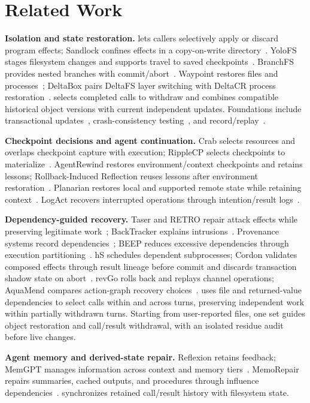 \section{Related Work}

\textbf{Isolation and state restoration.}
\trycmd lets callers selectively apply or discard program effects; Sandlock
confines effects in a copy-on-write directory~\cite{try-osdi26,sandlock}.
YoloFS stages filesystem changes and supports travel to saved
checkpoints~\cite{yolofs}.
BranchFS provides nested branches with commit/abort~\cite{branchfs}.
Waypoint restores files and
processes~\cite{waypoint}; DeltaBox pairs DeltaFS layer switching with
DeltaCR process restoration~\cite{deltabox}. \system selects completed calls
to withdraw and combines compatible historical object versions with current
independent updates. Foundations
include transactional updates~\cite{valor,txfs}, crash-consistency
testing~\cite{crashmonkey}, and record/replay~\cite{revirt,rr}.

\textbf{Checkpoint decisions and agent continuation.}
Crab selects resources and overlaps checkpoint capture with execution;
RippleCP selects checkpoints to materialize~\cite{crab,ripplecp}.
AgentRewind restores environment/context checkpoints and retains lessons;
Rollback-Induced Reflection reuses lessons after environment
restoration~\cite{agentrewind,rir}. Planarian restores local and supported
remote state while retaining context~\cite{planarian}. LogAct recovers
interrupted operations through intention/result logs~\cite{logact}.

\textbf{Dependency-guided recovery.}
Taser and RETRO repair attack effects while preserving legitimate
work~\cite{taser,retro}; BackTracker explains intrusions~\cite{backtracker}.
Provenance systems record dependencies~\cite{pass,hifi,camflow}; BEEP
reduces excessive dependencies through execution partitioning~\cite{beep}.
hS schedules dependent subprocesses; Cordon validates composed effects
through result lineage before commit and discards transaction shadow state on
abort~\cite{hs-osdi26,cordon}. revGo rolls back and replays channel operations; AquaMend
compares action-graph recovery choices~\cite{revgo,aquamend}. \system uses
file and returned-value dependencies to select calls within and across turns,
preserving independent work within partially withdrawn turns.
Starting from user-reported files, one set guides object restoration and
call/result withdrawal, with an isolated residue audit before live changes.

\textbf{Agent memory and derived-state repair.}
Reflexion retains feedback; MemGPT manages information across context and memory
tiers~\cite{reflexion,memgpt}. MemoRepair repairs summaries, cached outputs,
and procedures through influence dependencies~\cite{memorepair}.
\system synchronizes retained call/result history with filesystem state.
